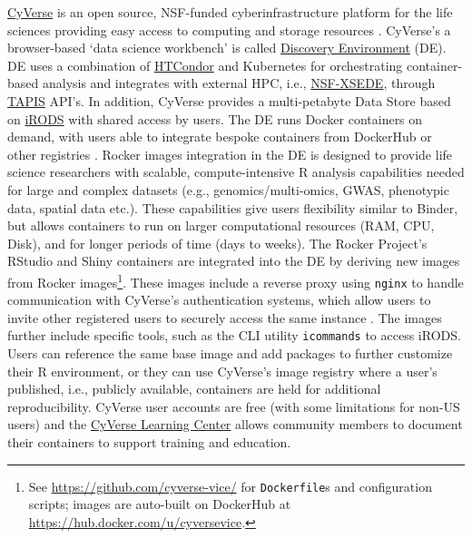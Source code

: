\href{https://cyverse.org}{CyVerse} is an open source, NSF-funded
cyberinfrastructure platform for the life sciences providing easy access
to computing and storage resources \citep{merchant_iplant_2016}.
CyVerse's a browser-based `data science workbench' is called
\href{https://cyverse.org/discovery-environment}{Discovery Environment}
(DE). DE uses a combination of
\href{https://research.cs.wisc.edu/htcondor/}{HTCondor} and Kubernetes
for orchestrating container-based analysis and integrates with external
HPC, i.e., \href{https://www.xsede.org/}{NSF-XSEDE}, through
\href{https://www.tacc.utexas.edu/tapis}{TAPIS} API's. In addition,
CyVerse provides a multi-petabyte Data Store based on
\href{https://irods.org/}{iRODS} with shared access by users. The DE
runs Docker containers on demand, with users able to integrate bespoke
containers from DockerHub or other registries
\citep{devisetty_bringing_2016}. Rocker images integration in the DE is
designed to provide life science researchers with scalable,
compute-intensive R analysis capabilities needed for large and complex
datasets (e.g., genomics/multi-omics, GWAS, phenotypic data, spatial
data etc.). These capabilities give users flexibility similar to Binder,
but allows containers to run on larger computational resources (RAM,
CPU, Disk), and for longer periods of time (days to weeks). The Rocker
Project's RStudio and Shiny containers are integrated into the DE by
deriving new images from Rocker
images\footnote{See \href{https://github.com/cyverse-vice/}{https://github.com/cyverse-vice/} for \texttt{Dockerfile}s and configuration scripts; images are auto-built on DockerHub at \href{https://hub.docker.com/u/cyversevice}{https://hub.docker.com/u/cyversevice}.}.
These images include a reverse proxy using \texttt{nginx} to handle
communication with CyVerse's authentication systems, which allow users
to invite other registered users to securely access the same instance
\citep{rstudio_proxy_2020}. The images further include specific tools,
such as the CLI utility \texttt{icommands} to access iRODS. Users can
reference the same base image and add packages to further customize
their R environment, or they can use CyVerse's image registry where a
user's published, i.e., publicly available, containers are held for
additional reproducibility. CyVerse user accounts are free (with some
limitations for non-US users) and the
\href{https://learning.cyverse.org/}{CyVerse Learning Center} allows
community members to document their containers to support training and
education.

